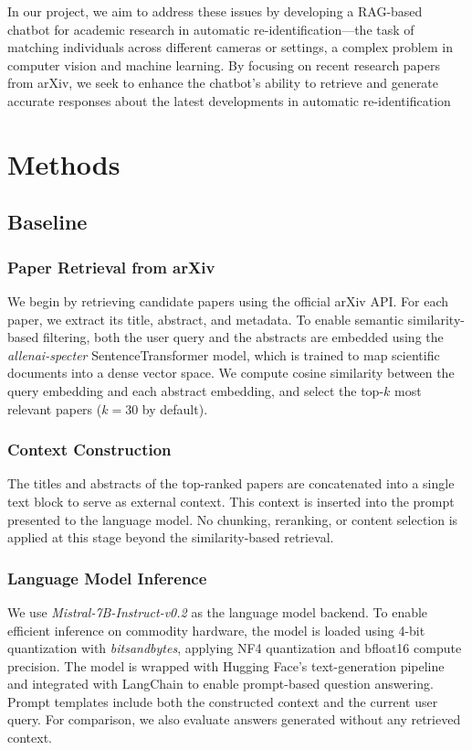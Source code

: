 \documentclass[fleqn,moreauthors,10pt]{ds_report}
\begin{document}
In our project, we aim to address these issues by developing a RAG-based chatbot for academic research in automatic re-identification—the task of matching individuals across different cameras or settings, a complex problem in computer vision and machine learning. By focusing on recent research papers from arXiv, we seek to enhance the chatbot’s ability to retrieve and generate accurate responses about the latest developments in automatic re-identification


\section*{Methods}
\subsection*{Baseline}
\subsubsection*{Paper Retrieval from arXiv}
We begin by retrieving candidate papers using the official arXiv API. For each paper, we extract its title, abstract, and metadata. To enable semantic similarity-based filtering, both the user query and the abstracts are embedded using the \textit{allenai-specter} SentenceTransformer model, which is trained to map scientific documents into a dense vector space. We compute cosine similarity between the query embedding and each abstract embedding, and select the top-$k$ most relevant papers ($k=30$ by default).

\subsubsection*{Context Construction}
The titles and abstracts of the top-ranked papers are concatenated into a single text block to serve as external context. This context is inserted into the prompt presented to the language model. No chunking, reranking, or content selection is applied at this stage beyond the similarity-based retrieval.

\subsubsection*{Language Model Inference}
We use \textit{Mistral-7B-Instruct-v0.2} as the language model backend. To enable efficient inference on commodity hardware, the model is loaded using 4-bit quantization with \textit{bitsandbytes}, applying NF4 quantization and bfloat16 compute precision. The model is wrapped with Hugging Face's text-generation pipeline and integrated with LangChain to enable prompt-based question answering. Prompt templates include both the constructed context and the current user query. For comparison, we also evaluate answers generated without any retrieved context.
\end{document}
